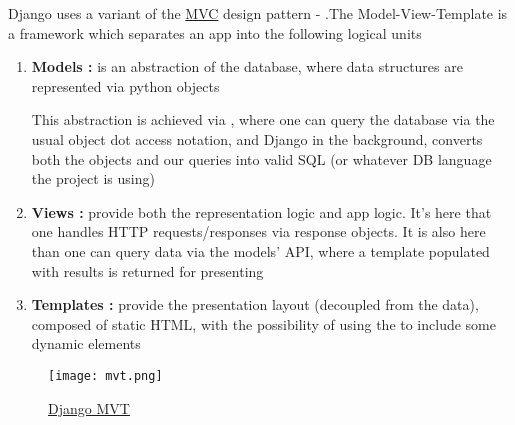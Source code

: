 
\par{Django uses a variant of the
\href{https://blog.codinghorror.com/understanding-model-view-controller/}{MVC}
design pattern - .The Model-View-Template is a  framework which separates
an app into the following logical units}

\begin{enumerate}
	\item{\textbf{Models : } is an abstraction of the database, where data
structures are represented via python objects}

	\par{This abstraction is achieved via  ,
where one can query the database via the usual object dot access notation, and
Django in the background, converts both the objects and our queries into valid
SQL (or whatever DB language the project is using)}

	\item{\textbf{Views : } provide both the representation logic and app logic.
It's here that one handles HTTP requests/responses via response objects. It
is also here than one can query data via
the models' API, where a template populated with results is returned for
presenting}
	\item{\textbf{Templates : } provide the presentation layout (decoupled from
the data), composed of
static HTML, with the possibility of using the  to
include some dynamic elements}
\end{enumerate}

	\begin{figure}[H]
		\texttt{[image: mvt.png]}
		\caption{\href{https://djangobook.com/mdj2-django-structure/}{Django
MVT}}
	\end{figure}



